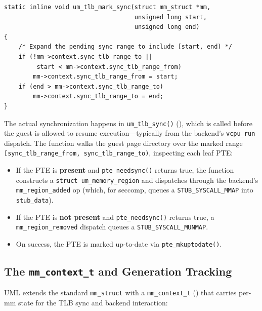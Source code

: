 \begin{lstlisting}[language=KernelC,caption={TLB mark for deferred sync (from \texttt{pgtable.h})},label=lst:tlb-mark]
static inline void um_tlb_mark_sync(struct mm_struct *mm,
                                    unsigned long start,
                                    unsigned long end)
{
    /* Expand the pending sync range to include [start, end) */
    if (!mm->context.sync_tlb_range_to ||
         start < mm->context.sync_tlb_range_from)
        mm->context.sync_tlb_range_from = start;
    if (end > mm->context.sync_tlb_range_to)
        mm->context.sync_tlb_range_to = end;
}
\end{lstlisting}

The actual synchronization happens in \texttt{um\_tlb\_sync()}
(), which is called before the guest is allowed
to resume execution---typically from the backend's \texttt{vcpu\_run} dispatch.
The function walks the guest page directory over the marked range
\texttt{[sync\_tlb\_range\_from, sync\_tlb\_range\_to)}, inspecting each leaf
PTE:

\begin{itemize}[nosep]
\item If the PTE is \textbf{present} and \texttt{pte\_needsync()} returns true,
  the function constructs a \texttt{struct um\_memory\_region} and dispatches
  through the backend's \texttt{mm\_region\_added} op (which, for seccomp,
  queues a \texttt{STUB\_SYSCALL\_MMAP} into \texttt{stub\_data}).
\item If the PTE is \textbf{not present} and \texttt{pte\_needsync()} returns
  true, a \texttt{mm\_region\_removed} dispatch queues a
  \texttt{STUB\_SYSCALL\_MUNMAP}.
\item On success, the PTE is marked up-to-date via \texttt{pte\_mkuptodate()}.
\end{itemize}

\subsection{The \texttt{mm\_context\_t} and Generation Tracking}
\label{sec:impl-mm-context}

UML extends the standard \texttt{mm\_struct} with a \texttt{mm\_context\_t}
() that carries per-mm state for the
TLB sync and backend interaction:

